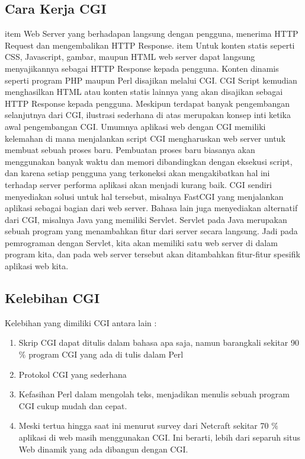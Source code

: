 \begin{enumerate}
\subsection{Cara Kerja CGI}
item Web Server yang berhadapan langsung dengan pengguna, menerima HTTP Request dan mengembalikan HTTP Response. 
item Untuk konten statis seperti CSS, Javascript, gambar, maupun HTML web server dapat langsung menyajikannya sebagai HTTP Response kepada pengguna. Konten dinamis seperti program PHP maupun Perl disajikan melalui CGI. CGI Script kemudian menghasilkan HTML atau konten statis lainnya yang akan disajikan sebagai HTTP Response kepada pengguna.
Meskipun terdapat banyak pengembangan selanjutnya dari CGI, ilustrasi sederhana di atas merupakan konsep inti ketika awal pengembangan CGI. Umumnya aplikasi web dengan CGI memiliki kelemahan di mana menjalankan script CGI mengharuskan web server untuk membuat sebuah proses baru. Pembuatan proses baru biasanya akan menggunakan banyak waktu dan memori dibandingkan dengan eksekusi script, dan karena setiap pengguna yang terkoneksi akan mengakibatkan hal ini terhadap server performa aplikasi akan menjadi kurang baik. 
CGI sendiri menyediakan solusi untuk hal tersebut, misalnya FastCGI yang menjalankan aplikasi sebagai bagian dari web server. Bahasa lain juga menyediakan alternatif dari CGI, misalnya Java yang memiliki Servlet. Servlet pada Java merupakan sebuah program yang menambahkan fitur dari server secara langsung. Jadi pada pemrograman dengan Servlet, kita akan memiliki satu web server di dalam program kita, dan pada web server tersebut akan ditambahkan fitur-fitur spesifik aplikasi web kita. 

\subsection{Kelebihan CGI} 
Kelebihan yang dimiliki CGI antara lain :
\begin{enumerate}
	\item Skrip CGI dapat ditulis dalam bahasa apa saja, namun barangkali sekitar 90 $  \%  $ program CGI yang ada di tulis dalam Perl 
	\item Protokol CGI yang sederhana
	\item Kefasihan Perl dalam mengolah teks, menjadikan menulis sebuah program CGI cukup mudah dan cepat.
	\item Meski tertua hingga saat ini menurut survey dari Netcraft sekitar 70 $  \%  $ aplikasi di web masih menggunakan CGI. Ini berarti, lebih dari separuh situs Web dinamik yang ada dibangun dengan CGI.
\end{enumerate}


\end{enumerate}
